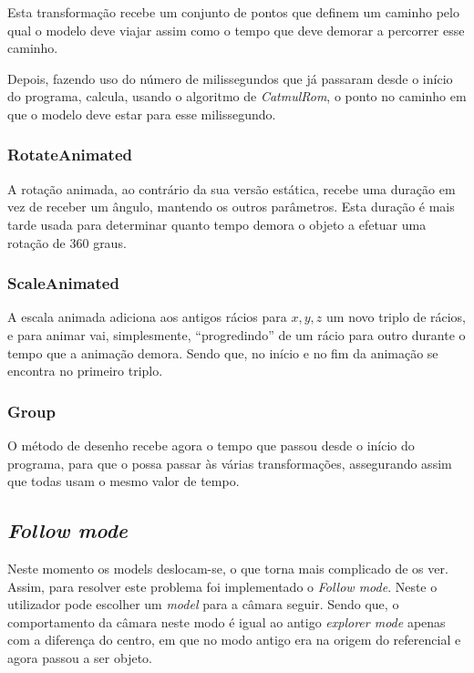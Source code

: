 \documentclass[a4paper]{article}
\begin{document}
Esta transformação recebe um conjunto de pontos que definem um caminho pelo qual o modelo deve viajar assim como o tempo que deve demorar a percorrer esse caminho.

Depois, fazendo uso do número de milissegundos que já passaram desde o início do programa, calcula, usando o algoritmo de \textit{CatmulRom}, o ponto no caminho em que o modelo deve estar para esse milissegundo.

\subsubsection{RotateAnimated}\label{sec:rotate}

A rotação animada, ao contrário da sua versão estática, recebe uma duração em vez de receber um ângulo, mantendo os outros parâmetros. Esta duração é mais tarde usada para determinar quanto tempo demora o objeto a efetuar uma rotação de 360\degree{} graus.

\subsubsection{ScaleAnimated}\label{sec:scale}

A escala animada adiciona aos antigos rácios para $x, y, z$ um novo triplo de rácios, e para animar vai, simplesmente, ``progredindo'' de um rácio para outro durante o tempo que a animação demora. Sendo que, no início e no fim da animação se encontra no primeiro triplo.

\subsubsection{Group}

O método de desenho recebe agora o tempo que passou desde o início do programa, para que o possa passar às várias transformações, assegurando assim que todas usam o mesmo valor de tempo.

\subsection{\textit{Follow mode}}

Neste momento os models deslocam-se, o que torna mais complicado de os ver. Assim, para resolver este problema
foi implementado o \textit{Follow mode}. Neste o utilizador pode escolher um \textit{model}
para a câmara seguir. Sendo que, o comportamento da câmara neste modo é igual ao antigo
\textit{explorer mode} apenas com a diferença do centro, em que no modo antigo era na origem do referencial e agora passou a ser objeto.
\end{document}
